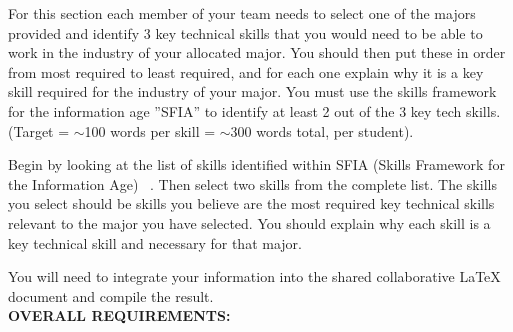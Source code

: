 \documentclass[a4paper, 11pt]{report}
\begin{document}
For this section each member of your team needs to select one of the majors provided and identify 3 key technical skills that you would need to be able to work in the industry of your allocated major. You should then put these in order from most required to least required, and for each one explain why it is a key skill required for the industry of your major. You must use the skills framework for the information age ''SFIA'' to identify at least 2 out of the 3 key tech skills. (Target = $\sim$100 words per skill = $\sim$300 words total, per student).

Begin by looking at the list of skills identified within SFIA (Skills Framework for the Information Age) ~\cite{sfia}. Then select two skills from the complete list. The skills you select should be skills you believe are the most required key technical skills relevant to the major you have selected. You should explain why each skill is a key technical skill and necessary for that major.

You will need to integrate your information into the shared collaborative LaTeX document and compile the result.\\[2mm]



\textbf{OVERALL REQUIREMENTS:}
\end{document}
